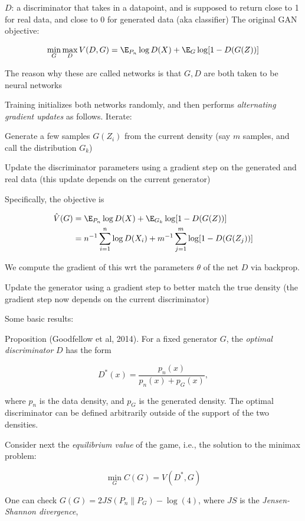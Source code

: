 \documentclass[english]{article}
\begin{document}
$D$: a discriminator that takes in a datapoint, and is supposed to return close to 1 for real data, and close to 0 for generated data (aka classifier)
\eitem 
The original GAN objective: 

$$\min_G\max_D V(D,G) = \E_{P_n} \log D(X) + \E_{G} \log[1-D(G(Z))] $$
 
The reason why these are called networks is that $G,D$ are both taken to be neural networks

\item Training initializes both networks randomly, and then performs \emph{alternating gradient updates} as follows.  Iterate:
\benum
\item Generate a few samples $G(Z_i)$ from the current density (say $m$ samples, and call the distribution $G_k$)
\item Update the discriminator parameters  using a gradient step on the generated and real data (this update depends on the current generator)

Specifically, the objective is

\begin{align*}
\hat V(G) & = \E_{P_n} \log D(X) + \E_{G_k} \log[1-D(G(Z))]\\
&= n^{-1}\sum_{i=1}^n\log D(X_i) + m^{-1}\sum_{j=1}^m \log[1-D(G(Z_j))]
\end{align*}

We compute the gradient of this wrt the parameters $\theta$ of the net $D$ via backprop. 


\item Update the generator using a gradient step to better match the true density (the gradient step now depends on the current discriminator)
\eenum

\item Some basic results: 

Proposition (Goodfellow et al, 2014). For a fixed generator $G$, the \emph{optimal discriminator} $D$ has the form 

$$D^*(x) = \frac{p_n(x)}{p_n(x)+p_G(x)},$$

where $p_n$ is the data density, and $p_G$ is the generated density. The optimal discriminator can be defined arbitrarily outside of the support of the two densities. 

Consider next the \emph{equilibrium value} of the game, i.e., the solution to the minimax problem: 

$$\min_G C(G)  = V(D^*,G) $$
 
One can check $G(G) = 2 JS(P_n \| P_G) - \log(4)$, where $JS$ is the \emph{Jensen-Shannon divergence}, 
\end{document}
